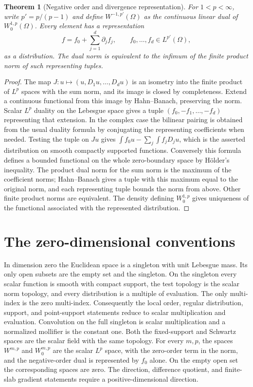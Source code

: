 \documentclass[11pt,oneside,openany]{book}
\newtheorem{theorem}{Theorem}[chapter]
\theoremstyle{definition}
\theoremstyle{remark}
\begin{document}
\begin{theorem}[Negative order and divergence representation]
\label{p102:U4-07}
For \(1<p<\infty\), write \(p'=p/(p-1)\) and define \(W^{-1,p'}(\Omega)\) as the continuous linear dual of \(W_0^{1,p}(\Omega)\). Every element has a representation
\[
 f=f_0+\sum_{j=1}^d \partial_j f_j,\qquad f_0,\ldots,f_d\in L^{p'}(\Omega),
\]
as a distribution. The dual norm is equivalent to the infimum of the finite product norm of such representing tuples.
\end{theorem}
\begin{proof}
The map \(J:u\mapsto(u,D_1u,\ldots,D_du)\) is an isometry into the finite product of \(L^p\) spaces with the sum norm, and its image is closed by completeness. Extend a continuous functional from this image by Hahn--Banach, preserving the norm. Scalar \(L^p\) duality on the Lebesgue space gives a tuple \((f_0,-f_1,\ldots,-f_d)\) representing that extension. In the complex case the bilinear pairing is obtained from the usual duality formula by conjugating the representing coefficients when needed. Testing the tuple on \(Ju\) gives \(\int f_0u-\sum_j\int f_jD_ju\), which is the asserted distribution on smooth compactly supported functions. Conversely this formula defines a bounded functional on the whole zero-boundary space by H\"older's inequality. The product dual norm for the sum norm is the maximum of the coefficient norms; Hahn--Banach gives a tuple with this maximum equal to the original norm, and each representing tuple bounds the norm from above. Other finite product norms are equivalent. The density defining \(W_0^{1,p}\) gives uniqueness of the functional associated with the represented distribution.
\end{proof}

\section{The zero-dimensional conventions}

In dimension zero the Euclidean space is a singleton with unit Lebesgue mass. Its only open subsets are the empty set and the singleton. On the singleton every scalar function is smooth with compact support, the test topology is the scalar norm topology, and every distribution is a multiple of evaluation. The only multi-index is the zero multi-index. Consequently the local order, regular distribution, support, and point-support statements reduce to scalar multiplication and evaluation. Convolution on the full singleton is scalar multiplication and a normalized mollifier is the constant one. Both the fixed-support and Schwartz spaces are the scalar field with the same topology. For every \(m,p\), the spaces \(W^{m,p}\) and \(W_0^{m,p}\) are the scalar \(L^p\) space, with the zero-order term in the norm, and the negative-order dual is represented by \(f_0\) alone. On the empty open set the corresponding spaces are zero. The direction, difference quotient, and finite-slab gradient statements require a positive-dimensional direction.
\end{document}
